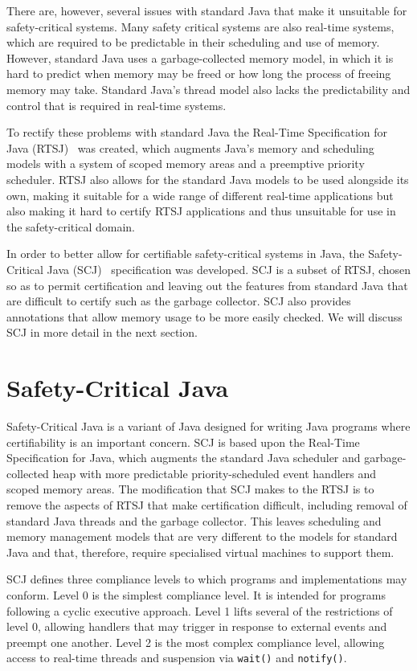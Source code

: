 \documentclass[a4paper,10pt]{report}
\begin{document}
There are, however, several issues with standard Java that make it unsuitable
for safety-critical systems. Many safety critical systems are also real-time
systems, which are required to be predictable in their scheduling and use of
memory. However, standard Java uses a garbage-collected memory model, in which
it is hard to predict when memory may be freed or how long the process of
freeing memory may take. Standard Java's thread model also lacks the
predictability and control that is required in real-time systems.

To rectify these problems with standard Java the Real-Time Specification for
Java (RTSJ)~\cite{gosling2000} was created, which augments Java's memory and
scheduling models with a system of scoped memory areas and a preemptive priority
scheduler. RTSJ also allows for the standard Java models to be used alongside
its own, making it suitable for a wide range of different real-time applications
but also making it hard to certify RTSJ applications and thus unsuitable for use
in the safety-critical domain.

In order to better allow for certifiable safety-critical systems in Java, the
Safety-Critical Java (SCJ)~\cite{locke2013} specification was developed. SCJ is
a subset of RTSJ, chosen so as to permit certification and leaving out the
features from standard Java that are difficult to certify such as the garbage
collector. SCJ also provides annotations that allow memory usage to be more
easily checked. We will discuss SCJ in more detail in the next section.

\section{Safety-Critical Java}
\label{scj-section}

Safety-Critical Java is a variant of Java designed for writing Java programs
where certifiability is an important concern.  SCJ is based upon the Real-Time
Specification for Java, which augments the standard Java scheduler and
garbage-collected heap with more predictable priority-scheduled event handlers
and scoped memory areas.  The modification that SCJ makes to the RTSJ is to
remove the aspects of RTSJ that make certification difficult, including removal
of standard Java threads and the garbage collector.  This leaves scheduling and
memory management models that are very different to the models for standard Java
and that, therefore, require specialised virtual machines to support them.

SCJ defines three compliance levels to which programs and implementations may
conform. Level 0 is the simplest compliance level. It is intended for programs
following a cyclic executive approach. Level 1 lifts several of the restrictions
of level 0, allowing handlers that may trigger in response to external events
and preempt one another. Level 2 is the most complex compliance level, allowing
access to real-time threads and suspension via \texttt{wait()} and
\texttt{notify()}.  
\end{document}
